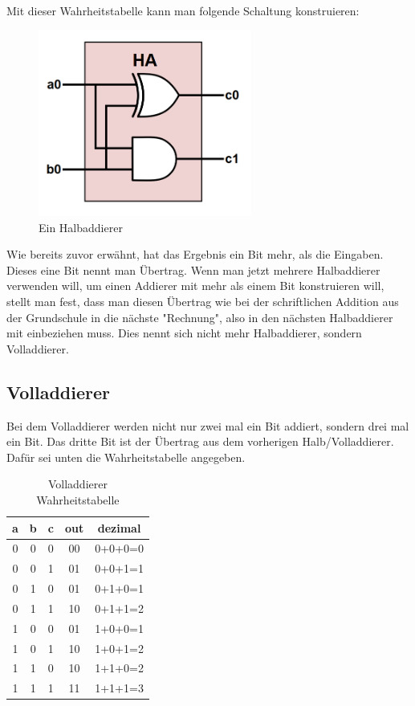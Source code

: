 \documentclass[12pt, a4paper]{article}
\begin{document}
Mit dieser Wahrheitstabelle kann man folgende Schaltung konstruieren:

\begin{figure}[H]
	\begin{center}
		\includegraphics [width=7cm]{Halbaddierer.png}
	\end{center}
	\caption{Ein Halbaddierer}
\end{figure}

Wie bereits zuvor erwähnt, hat das Ergebnis ein Bit mehr, als die Eingaben. Dieses eine Bit nennt man Übertrag. Wenn man jetzt mehrere Halbaddierer verwenden will, um einen Addierer mit mehr als einem Bit konstruieren will, stellt man fest, dass man diesen Übertrag wie bei der schriftlichen Addition aus der Grundschule in die nächste "Rechnung", also in den nächsten Halbaddierer mit einbeziehen muss. Dies nennt sich nicht mehr Halbaddierer, sondern Volladdierer.

\subsection{Volladdierer}
Bei dem Volladdierer werden nicht nur zwei mal ein Bit addiert, sondern drei mal ein Bit. Das dritte Bit ist der Übertrag aus dem vorherigen Halb/Volladdierer. Dafür sei unten die Wahrheitstabelle angegeben. 

\begin{table}[H]
	\begin{center}
		\begin{tabular}{|c|c|c|c|c|} \hline
			a&b&c&out&dezimal \\ \hline
			0&0&0&00&0+0+0=0 \\
			0&0&1&01&0+0+1=1 \\
			0&1&0&01&0+1+0=1 \\
			0&1&1&10&0+1+1=2 \\
			1&0&0&01&1+0+0=1 \\
			1&0&1&10&1+0+1=2 \\
			1&1&0&10&1+1+0=2 \\
			1&1&1&11&1+1+1=3 \\ \hline
		\end{tabular}\\
	\end{center}
	\caption{Volladdierer Wahrheitstabelle}
\end{table}
\end{document}
